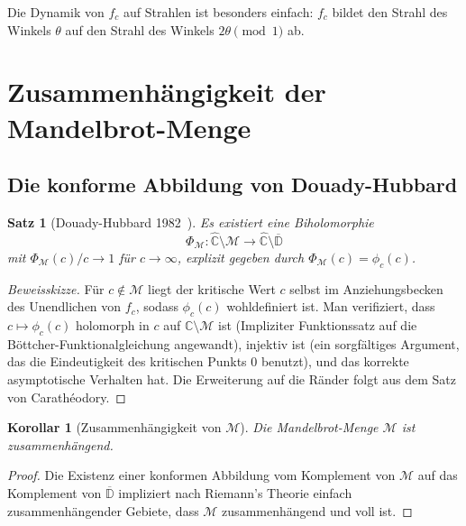 \documentclass[12pt,a4paper]{amsart}
\newtheorem{satz}[theorem]{Satz}
\newtheorem{korollar}[theorem]{Korollar}
\theoremstyle{definition}
\theoremstyle{remark}
\begin{document}
Die Dynamik von $f_c$ auf Strahlen ist besonders einfach: $f_c$ bildet
den Strahl des Winkels $\theta$ auf den Strahl des Winkels $2\theta \pmod 1$ ab.

\section{Zusammenhängigkeit der Mandelbrot-Menge}

\subsection{Die konforme Abbildung von Douady-Hubbard}

\begin{satz}[Douady-Hubbard 1982~\cite{DouadyHubbard1982}]
\label{satz:DH}
Es existiert eine Biholomorphie
\[
    \Phi_{\mathcal{M}} \colon \widehat{\mathbb{C}} \setminus \mathcal{M}
    \longrightarrow \widehat{\mathbb{C}} \setminus \overline{\mathbb{D}}
\]
mit $\Phi_{\mathcal{M}}(c)/c \to 1$ für $c \to \infty$, explizit gegeben
durch $\Phi_{\mathcal{M}}(c) = \phi_c(c)$.
\end{satz}

\begin{proof}[Beweisskizze]
Für $c \notin \mathcal{M}$ liegt der kritische Wert $c$ selbst im
Anziehungsbecken des Unendlichen von $f_c$, sodass $\phi_c(c)$ wohldefiniert
ist. Man verifiziert, dass $c \mapsto \phi_c(c)$ holomorph in $c$ auf
$\mathbb{C} \setminus \mathcal{M}$ ist (Impliziter Funktionssatz auf die
Böttcher-Funktionalgleichung angewandt), injektiv ist (ein sorgfältiges
Argument, das die Eindeutigkeit des kritischen Punkts $0$ benutzt), und
das korrekte asymptotische Verhalten hat. Die Erweiterung auf die Ränder
folgt aus dem Satz von Carathéodory.
\end{proof}

\begin{korollar}[Zusammenhängigkeit von $\mathcal{M}$]
Die Mandelbrot-Menge $\mathcal{M}$ ist zusammenhängend.
\end{korollar}

\begin{proof}
Die Existenz einer konformen Abbildung vom Komplement von $\mathcal{M}$
auf das Komplement von $\overline{\mathbb{D}}$ impliziert nach Riemann's
Theorie einfach zusammenhängender Gebiete, dass $\mathcal{M}$ zusammenhängend
und voll ist.
\end{proof}
\end{document}
